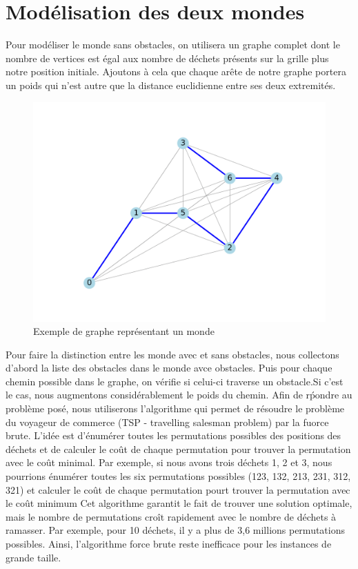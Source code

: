 \documentclass{report}
\begin{document}
\section{\Large Mod\'elisation des deux mondes}
\hspace{0,5 cm} \Large Pour mod\'eliser le monde sans obstacles, on utilisera un graphe complet dont le nombre de vertices est \'egal aux nombre de d\'echets pr\'esents sur la grille plus notre 
position initiale. Ajoutons \`a cela que chaque ar\^ete de notre graphe portera un poids qui n'est autre que la distance euclidienne entre ses deux extremit\'es.
\begin{figure}[!h]
    \centerline{\includegraphics[scale=1]{best_path_arbitrary-1.png}}
    \caption{Exemple de graphe repr\'esentant un monde} 
  \end{figure}
Pour faire la distinction entre les monde avec et sans obstacles, nous collectons d'abord la liste des obstacles dans le monde avce obstacles. Puis pour chaque chemin possible dans le graphe,
on v\'erifie si celui-ci traverse un obstacle.Si c'est le cas, nous augmentons considérablement le poids du chemin.
Afin de r\'pondre au problème posé, nous utiliserons l'algorithme qui permet de résoudre le problème du voyageur de commerce (TSP - travelling salesman problem) par la fuorce brute. L'id\'ee est d'\'enum\'erer toutes 
les permutations possibles des positions des d\'echets et de calculer le co\^ut de chaque permutation pour trouver la permutation avec le co\^ut minimal. Par exemple, si nous avons trois d\'echets 1, 2 et 3, nous pourrions \'enum\'erer toutes les six permutations possibles (123, 132, 213, 231, 312, 321) et calculer le co\^ut de chaque permutation pourt trouver la permutation avec le co\^ut minimum
Cet algorithme garantit le fait de trouver une solution optimale, mais le nombre de permutations cro\^it rapidement avec le nombre de d\'echets \`a ramasser. Par exemple, pour 10 d\'echets, il y a plus de 3,6 millions permutations possibles. Ainsi, l'algorithme force brute reste inefficace pour les instances de grande taille. \\
\end{document}
